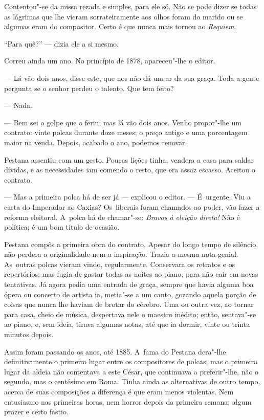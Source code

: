 \begin{linenumbers}
Contentou"-se da missa rezada e simples, para ele só. Não se pode dizer
se todas as lágrimas que lhe vieram sorrateiramente aos olhos foram do
marido ou se algumas eram do compositor. Certo é que nunca mais tornou
ao \emph{Requiem}.

``Para quê?'' --- dizia ele a si mesmo.

Correu ainda um ano. No princípio de 1878, apareceu"-lhe o editor.

--- Lá vão dois anos, disse este, que nos não dá um ar da sua graça. Toda
a gente pergunta se o senhor perdeu o talento. Que tem feito?

--- Nada.

--- Bem sei o golpe que o feriu; mas lá vão dois anos. Venho propor"-lhe
um contrato: vinte polcas durante doze meses; o preço antigo e uma
porcentagem maior na venda. Depois, acabado o ano, podemos renovar.

Pestana assentiu com um gesto. Poucas lições tinha, vendera a casa para
saldar dívidas, e as necessidades iam comendo o resto, que era assaz
escasso. Aceitou o contrato.

--- Mas a primeira polca há de ser já --- explicou o editor. --- É~urgente.
Viu a carta do Imperador ao Caxias? Os~liberais foram chamados ao poder,
vão fazer a reforma eleitoral. A~polca há de chamar"-se: \emph{Bravos à
eleição direta!} Não é política; é um bom título de ocasião.

Pestana compôs a primeira obra do contrato. Apesar do longo tempo de
silêncio, não perdera a originalidade nem a inspiração. Trazia a mesma
nota genial. As~outras polcas vieram vindo, regularmente. Conservara os
retratos e os repertórios; mas fugia de gastar todas as noites ao piano,
para não cair em novas tentativas. Já agora pedia uma entrada de graça,
sempre que havia alguma boa ópera ou concerto de artista ia, metia"-se a
um canto, gozando aquela porção de coisas que nunca lhe haviam de brotar
do cérebro. Uma ou outra vez, ao tornar para casa, cheio de música,
despertava nele o maestro inédito; então, sentava"-se ao piano, e, sem
ideia, tirava algumas notas, até que ia dormir, vinte ou trinta minutos
depois.

Assim foram passando os anos, até 1885. A~fama do Pestana dera"-lhe
definitivamente o primeiro lugar entre os compositores de polcas; mas o
primeiro lugar da aldeia não contentava a este César, que continuava a
preferir"-lhe, não o segundo, mas o centésimo em Roma. Tinha ainda as
alternativas de outro tempo, acerca de suas composições a diferença é
que eram menos violentas. Nem entusiasmo nas primeiras horas, nem horror
depois da primeira semana; algum prazer e certo fastio.


\end{linenumbers}
